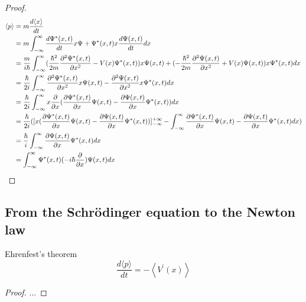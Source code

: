 \begin{proof}
    \begin{align*}
        \langle p \rangle & = m \frac{d \langle x \rangle}{d t}                                                                                                                                                                                                                                   \\
                          & = m \int_{-\infty}^{\infty} \frac{d \Psi^*(x,t)}{dt} x \Psi + \Psi^*(x,t) x \frac{d \Psi(x,t)}{dt} dx                                                                                                                                                                 \\
                          & = \frac{m}{i \hbar} \int_{-\infty}^{\infty} (\frac{\hbar^{2}}{2 m} \frac{\partial^{2} \Psi^{*}(x, t)}{\partial x^{2}}-V(x) \Psi^{*}(x, t)) x \Psi(x,t) +    (-\frac{\hbar^{2}}{2 m} \frac{\partial^{2} \Psi(x, t)}{\partial x^{2}} +V(x) \Psi(x, t)) x \Psi^*(x,t) dx \\
                          & = \frac{\hbar}{2i} \int_{-\infty}^{\infty} \frac{\partial^{2} \Psi^*(x, t)}{\partial x^{2}} x \Psi(x, t) - \frac{\partial^{2} \Psi(x, t)}{\partial x^{2}}  x \Psi^*(x, t) dx                                                                                                        \\
                          & = \frac{\hbar}{2i} \int_{-\infty}^{\infty} x \frac{\partial}{\partial x} (\frac{\partial \Psi^*(x, t)}{\partial x} \Psi(x, t) - \frac{\partial \Psi(x, t)}{\partial x} \Psi^*(x, t)) dx                                                                                             \\
                          & = \frac{\hbar}{2 i} ([x (\frac{\partial \Psi^*(x, t)}{\partial x} \Psi(x, t) - \frac{\partial \Psi(x, t)}{\partial x} \Psi^*(x, t))]_{-\infty}^{+\infty} - \int_{-\infty}^{\infty} \frac{\partial \Psi^*(x, t)}{\partial x} \Psi(x, t) - \frac{\partial \Psi(x, t)}{\partial x} \Psi^*(x, t) dx)
                          \\
                          &= \frac{\hbar}{i} \int_{-\infty}^{\infty} \frac{\partial \Psi (x,t)}{\partial x} \Psi^* (x,t) dx
                          \\
                          &= \int_{-\infty}^{\infty} \Psi^*(x,t) (-i\hbar \frac{\partial}{\partial x}) \Psi(x,t) dx
    \end{align*}
\end{proof}

\subsection{From the Schrödinger equation to the Newton law}
Ehrenfest's theorem
\begin{equation}
    \frac{d\langle p\rangle}{d t}=-\left\langle V^{\prime}(x)\right\rangle
\end{equation}
\begin{proof}
    ... 
\end{proof}


